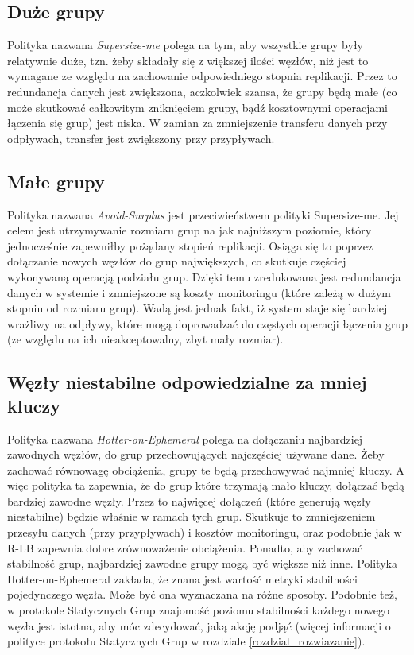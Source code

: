 \documentclass[12pt, twoside, openany]{report}
\begin{document}
\subsection{Duże grupy}
Polityka nazwana \textit{Supersize-me} polega na tym, aby wszystkie grupy były relatywnie duże, tzn. żeby składały się z większej ilości węzłów, niż jest to wymagane ze względu na zachowanie odpowiedniego stopnia replikacji. Przez to redundancja danych jest zwiększona, aczkolwiek szansa, że grupy będą małe (co może skutkować całkowitym zniknięciem grupy, bądź kosztownymi operacjami łączenia się grup) jest niska. W zamian za zmniejszenie transferu danych przy odpływach, transfer jest zwiększony przy przypływach.

\subsection{Małe grupy}
Polityka nazwana \textit{Avoid-Surplus} jest przeciwieństwem polityki Supersize-me. Jej celem jest utrzymywanie rozmiaru grup na jak najniższym poziomie, który jednocześnie zapewniłby pożądany stopień replikacji. Osiąga się to poprzez dołączanie nowych węzłów do grup największych, co skutkuje częściej wykonywaną operacją podziału grup. Dzięki temu zredukowana jest redundancja danych w systemie i zmniejszone są koszty monitoringu (które zależą w dużym stopniu od rozmiaru grup). Wadą jest jednak fakt, iż system staje się bardziej wrażliwy na odpływy, które mogą doprowadzać do częstych operacji łączenia grup (ze względu na ich nieakceptowalny, zbyt mały rozmiar).

\subsection{Węzły niestabilne odpowiedzialne za mniej kluczy}
Polityka nazwana \textit{Hotter-on-Ephemeral} polega na dołączaniu najbardziej zawodnych węzłów, do grup przechowujących najczęściej używane dane. Żeby zachować równowagę obciążenia, grupy te będą przechowywać najmniej kluczy. A więc polityka ta zapewnia, że do grup które trzymają mało kluczy, dołączać będą bardziej zawodne węzły. Przez to najwięcej dołączeń (które generują węzły niestabilne) będzie właśnie w ramach tych grup. Skutkuje to zmniejszeniem przesyłu danych (przy przypływach) i kosztów monitoringu, oraz podobnie jak w R-LB zapewnia dobre zrównoważenie obciążenia. Ponadto, aby zachować stabilność grup, najbardziej zawodne grupy mogą być większe niż inne. Polityka Hotter-on-Ephemeral zakłada, że znana jest wartość metryki stabilności pojedynczego węzła. Może być ona wyznaczana na różne sposoby. Podobnie też, w protokole Statycznych Grup znajomość poziomu stabilności każdego nowego węzła jest istotna, aby móc zdecydować, jaką akcję podjąć (więcej informacji o polityce protokołu Statycznych Grup w rozdziale \ref{rozdzial_rozwiazanie}).
\end{document}
